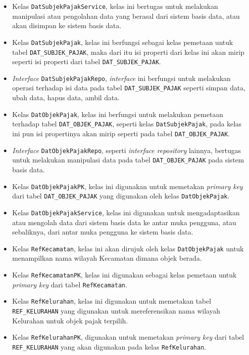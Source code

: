 \begin{itemize}
	\item Kelas \texttt{DatSubjekPajakService}, kelas ini bertugas untuk melakukan manipulasi atau pengolahan data yang berasal dari sistem basis data, atau akan disimpan ke sistem basis data.
	\item Kelas \texttt{DatSubjekPajak}, kelas ini berfungsi sebagai kelas pemetaan untuk tabel \texttt{DAT\_SUBJEK\_PAJAK}, maka dari itu isi properti dari kelas ini akan mirip seperti isi properti dari tabel \texttt{DAT\_SUBJEK\_PAJAK}.
	\item \textit{Interface} \texttt{DatSubjekPajakRepo}, \textit{interface} ini berfungsi untuk melakukan operasi terhadap isi data pada tabel \texttt{DAT\_SUBJEK\_PAJAK} seperti simpan data, ubah data, hapus data, ambil data.
	\item Kelas \texttt{DatObjekPajak}, kelas ini berfungsi untuk melakukan pemetaan terhadap tabel \texttt{DAT\_OBJEK\_PAJAK}, seperti kelas \texttt{DatSubjekPajak}, pada kelas ini pun isi propertinya akan mirip seperti pada tabel \texttt{DAT\_OBJEK\_PAJAK}.
	\item \textit{Interface} \texttt{DatObjekPajakRepo}, seperti \textit{interface repository} lainnya, bertugas untuk melakukan manipulasi data pada tabel \texttt{DAT\_OBJEK\_PAJAK} pada sistem basis data.
	\item Kelas \texttt{DatObjekPajakPK}, kelas ini digunakan untuk memetakan \textit{primary key} dari tabel \texttt{DAT\_OBJEK\_PAJAK} yang digunakan oleh kelas \texttt{DatObjekPajak}.
	\item Kelas \texttt{DatObjekPajakService}, kelas ini digunakan untuk mengadaptasikan atau mengolah data dari sistem basis data ke antar muka pengguna, atau sebaliknya, dari antar muka pengguna ke sistem basis data.
	\item Kelas \texttt{RefKecamatan}, kelas ini akan dirujuk oleh kelas \texttt{DatObjekPajak} untuk menampilkan nama wilayah Kecamatan dimana objek berada.
	\item Kelas \texttt{RefKecamatanPK}, kelas ini digunakan sebagai kelas pemetaan untuk \textit{primary key} dari tabel \texttt{RefKecamatan}.
	\item Kelas \texttt{RefKelurahan}, kelas ini digunakan untuk memetakan tabel \texttt{REF\_KELURAHAN} yang digunakan untuk mereferensikan nama wilayah Kelurahan untuk objek pajak terpilih.
	\item Kelas \texttt{RefKelurahanPK}, digunakan untuk memetakan \textit{primary key} dari tabel \texttt{REF\_KELURAHAN} yang akan digunakan pada kelas \texttt{RefKelurahan}.
\end{itemize}

